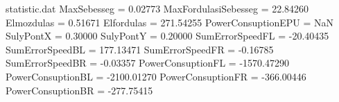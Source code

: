 \begin{filecontents*}{statistic.dat}
MaxSebesseg =    0.02773
MaxFordulasiSebesseg =   22.84260
Elmozdulas =    0.51671
Elfordulas =  271.54255
PowerConsuptionEPU =        NaN
SulyPontX =    0.30000
SulyPontY =    0.20000
SumErrorSpeedFL =  -20.40435
SumErrorSpeedBL =  177.13471
SumErrorSpeedFR =   -0.16785
SumErrorSpeedBR =   -0.03357
PowerConsuptionFL = -1570.47290
PowerConsuptionBL = -2100.01270
PowerConsuptionFR = -366.00446
PowerConsuptionBR = -277.75415
\end{filecontents*}
